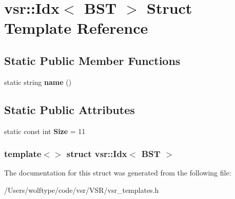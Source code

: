 \hypertarget{structvsr_1_1_idx_3_01_b_s_t_01_4}{\section{vsr\-:\-:Idx$<$ B\-S\-T $>$ Struct Template Reference}
\label{structvsr_1_1_idx_3_01_b_s_t_01_4}
}
\subsection*{Static Public Member Functions}
\begin{DoxyCompactItemize}
\item 
\hypertarget{structvsr_1_1_idx_3_01_b_s_t_01_4_ae4de526d584ba1efba505628953a8526}{static string {\bfseries name} ()}\label{structvsr_1_1_idx_3_01_b_s_t_01_4_ae4de526d584ba1efba505628953a8526}

\end{DoxyCompactItemize}
\subsection*{Static Public Attributes}
\begin{DoxyCompactItemize}
\item 
\hypertarget{structvsr_1_1_idx_3_01_b_s_t_01_4_a0c60e3fe0ffe949a36ec853a3522f60d}{static const int {\bfseries Size} = 11}\label{structvsr_1_1_idx_3_01_b_s_t_01_4_a0c60e3fe0ffe949a36ec853a3522f60d}

\end{DoxyCompactItemize}
\subsubsection*{template$<$$>$ struct vsr\-::\-Idx$<$ B\-S\-T $>$}



The documentation for this struct was generated from the following file\-:\begin{DoxyCompactItemize}
\item 
/\-Users/wolftype/code/vsr/\-V\-S\-R/vsr\-\_\-templates.\-h\end{DoxyCompactItemize}
